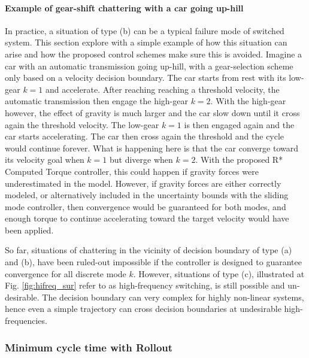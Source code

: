 \paragraph{Example of gear-shift chattering with a car going up-hill}

In practice, a situation of type (b) can be a typical failure mode of switched system. This section explore with a simple example of how this situation can arise and how the proposed control schemes make sure this is avoided. Imagine a car with an automatic transmission going up-hill, with a gear-selection scheme only based on a velocity decision boundary. The car starts from rest with its low-gear $k=1$ and accelerate. After reaching reaching a threshold velocity, the automatic transmission then engage the high-gear $k=2$. With the high-gear however, the effect of gravity is much larger and the car slow down until it cross again the threshold velocity. The low-gear $k=1$ is then engaged again and the car starts accelerating. The car then cross again the threshold and the cycle would continue forever. What is happening here is that the car converge toward its velocity goal when $k=1$ but diverge when $k=2$. With the proposed R* Computed Torque controller, this could happen if gravity forces were underestimated in the model. However, if gravity forces are either correctly modeled, or alternatively included in the uncertainty bounds with the sliding mode controller, then convergence would be guaranteed for both modes, and enough torque to continue accelerating toward the target velocity would have been applied. %

So far, situations of chattering in the vicinity of decision boundary of type (a) and (b), have been ruled-out impossible if the controller is designed to guarantee convergence for all discrete mode $k$. However, situations of type (c), illustrated at Fig. \ref{fig:hifreq_sur} refer to as high-frequency switching, is still possible and un-desirable. The decision boundary can very complex for highly non-linear systems, hence even a simple trajectory can cross decision boundaries at undesirable high-frequencies. 

\subsubsection{Minimum cycle time with Rollout}

